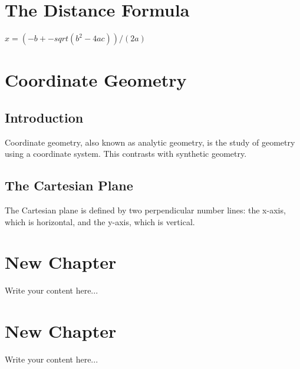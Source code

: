 \chapter{The Distance Formula}
$x = (-b +- sqrt(b^2 - 4a c)) / (2a)$

\chapter{Coordinate Geometry}
\section{Introduction}
Coordinate geometry, also known as analytic geometry, is the study of geometry using a coordinate system. This contrasts with synthetic geometry.

\section{The Cartesian Plane}
The Cartesian plane is defined by two perpendicular number lines: the x-axis, which is horizontal, and the y-axis, which is vertical.

\chapter{New Chapter}
Write your content here...

\chapter{New Chapter}
Write your content here...

